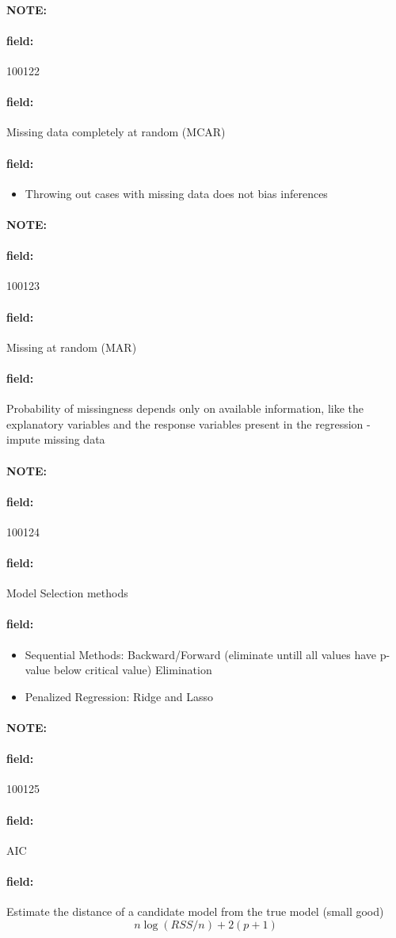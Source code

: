 \documentclass[12pt]{article}
\newenvironment{note}{\paragraph{NOTE:}}{}
\newenvironment{field}{\paragraph{field:}}{}
\begin{document}
\begin{note} \begin{field} \tiny 100122 \end{field}
 \begin{field}
  Missing data completely at random (MCAR)
 \end{field}
 \begin{field}
  \begin{itemize}
   \item Throwing out cases with missing data does not bias inferences
  \end{itemize}
 \end{field}
\end{note}

\begin{note} \begin{field} \tiny 100123 \end{field}
 \begin{field}
  Missing at random (MAR)
 \end{field}
 \begin{field}
  Probability of missingness depends only on available information, like the explanatory variables and the response variables present in the regression - impute missing data
 \end{field}
\end{note}

\begin{note} \begin{field} \tiny 100124 \end{field}
 \begin{field}
  Model Selection methods
 \end{field}
 \begin{field}
  \begin{itemize}
   \item Sequential Methods: Backward/Forward (eliminate untill all values have p-value below critical value) Elimination
   \item Penalized Regression: Ridge and Lasso
  \end{itemize}
 \end{field}
\end{note}

\begin{note} \begin{field} \tiny 100125 \end{field}
 \begin{field}
  AIC
 \end{field}
 \begin{field}
  Estimate the distance of a candidate model from the true model (small good)
  $$ n \log (RSS/n) + 2(p+1)$$
 \end{field}
\end{note}
\end{document}
